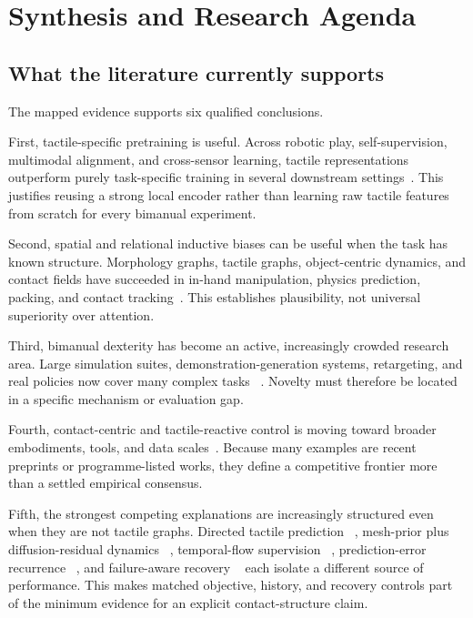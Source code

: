 \section{Synthesis and Research Agenda}
\label{sec:agenda}

\subsection{What the literature currently supports}

The mapped evidence supports six qualified conclusions.

First, tactile-specific pretraining is useful. Across robotic play,
self-supervision, multimodal alignment, and cross-sensor learning, tactile
representations outperform purely task-specific training in several downstream
settings~\cite{guzey2023tdex,higuera2025sparsh,yang2024unitouch,feng2025anytouch}.
This justifies reusing a strong local encoder rather than learning raw tactile
features from scratch for every bimanual experiment.

Second, spatial and relational inductive biases can be useful when the task has
known structure. Morphology graphs, tactile graphs, object-centric dynamics, and
contact fields have succeeded in in-hand manipulation, physics prediction,
packing, and contact tracking~\cite{funabashi2022distributed,yang2023tacgnn,ai2024robopack,higuera2023ncf}.
This establishes plausibility, not universal superiority over attention.

Third, bimanual dexterity has become an active, increasingly crowded research
area. Large simulation suites, demonstration-generation systems, retargeting, and
real policies now cover many complex tasks
~\cite{chen2022bidexhands,shaw2024bidex,jiang2024dexmimicgen,li2025maniptrans}.
Novelty must therefore be located in a specific mechanism or evaluation gap.

Fourth, contact-centric and tactile-reactive control is moving toward broader
embodiments, tools, and data scales~\cite{niu2026trex,yuan2026ftp1,ma2026semanticcontact,madan2026tactic,zhou2026touchworld}.
Because many examples are recent preprints or programme-listed works, they define
a competitive frontier more than a settled empirical consensus.

Fifth, the strongest competing explanations are increasingly structured even
when they are not tactile graphs. Directed tactile prediction
~\cite{xue2026hitacwam}, mesh-prior plus diffusion-residual dynamics
~\cite{wang2026meshpriordit}, temporal-flow supervision
~\cite{yang2026temporalflowvla}, prediction-error recurrence
~\cite{sawada2026predvla}, and failure-aware recovery
~\cite{zhao2026flare} each isolate a different source of performance. This makes
matched objective, history, and recovery controls part of the minimum evidence
for an explicit contact-structure claim.

